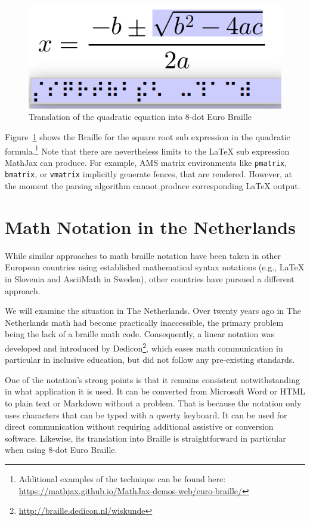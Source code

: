 \documentclass{article}
\begin{document}
\begin{figure}
  \includegraphics[width=.6\textwidth]{quadratic-square.png}
  \caption{Translation of the quadratic equation into 8-dot Euro Braille}
  \label{fig:subbraille}
\end{figure}

Figure~\ref{fig:subbraille} shows the Braille for the square root sub expression
in the quadratic formula.\footnote{Additional examples of the technique can be found
here: \url{https://mathjax.github.io/MathJax-demos-web/euro-braille/}} Note that
there are nevertheless limits to the {\LaTeX} sub expression MathJax can
produce. For example, AMS matrix environments like \texttt{pmatrix},
\texttt{bmatrix}, or \texttt{vmatrix} implicitly generate fences, that are
rendered. However, at the moment the parsing algorithm cannot produce
corresponding {\LaTeX} output.

\section{Math Notation in the Netherlands}\label{sec:math-netherlands}

While similar approaches to math braille notation have been taken in other
European countries using established mathematical syntax notations (e.g.,
{\LaTeX} in Slovenia and AsciiMath in Sweden), other countries have pursued a
different approach.

We will examine the situation in The Netherlands. Over twenty years ago in The
Netherlands math had become practically inaccessible, the primary problem being
the lack of a braille math code. Consequently, a linear notation was developed
and introduced by Dedicon\footnote{\url{http://braille.dedicon.nl/wiskunde}}, which eases
math communication in particular in inclusive education, but did not follow any
pre-existing standards.

One of the notation's strong points is that it remains consistent
notwithstanding in what application it is used. It can be converted from
Microsoft Word or HTML to plain text or Markdown without a problem. That is
because the notation only uses characters that can be typed with a qwerty
keyboard. It can be used for direct communication without requiring additional
assistive or conversion software. Likewise, its translation into Braille is
straightforward in particular when using 8-dot Euro Braille.
\end{document}
